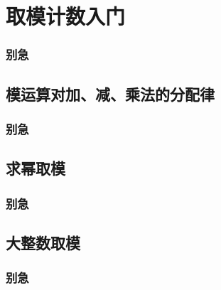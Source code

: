 
\section{取模计数入门}
\begin{frame} %
  \frametitle{别急}
\end{frame}
\subsection{模运算对加、减、乘法的分配律}
\begin{frame}[c]
  \progressnow*
\end{frame}
\begin{frame} %
  \frametitle{别急}
\end{frame}
\subsection{求幂取模}
\begin{frame}[c]
  \progressnow*
\end{frame}
\begin{frame} %
  \frametitle{别急}
\end{frame}
\subsection{大整数取模}
\begin{frame}[c]
  \progressnow*
\end{frame}
\begin{frame} %
  \frametitle{别急}
\end{frame}
